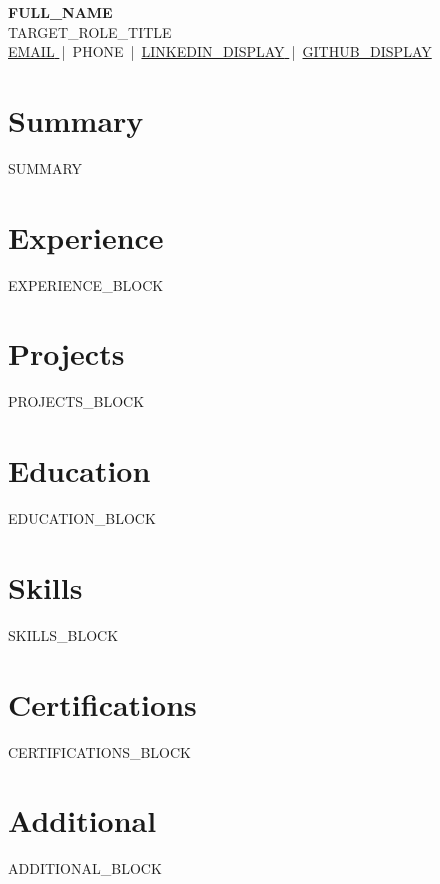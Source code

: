 \documentclass[a4paper,10pt]{article}
\begin{document}
\begin{center}
  {\LARGE\bfseries {{FULL_NAME}} }\\[3pt]
  {\small {{TARGET_ROLE_TITLE}} }\\[4pt]
  {\small
    \href{mailto:{{EMAIL}}}{ {{EMAIL}} } \,|\, {{PHONE}} \,|\,
    \href{ {{LINKEDIN_URL}} }{ {{LINKEDIN_DISPLAY}} } \,|\,
    \href{ {{GITHUB_URL}} }{ {{GITHUB_DISPLAY}} }
  }
\end{center}
\vspace{6pt}

\section*{Summary}
{{SUMMARY}}

\noindent
\begin{minipage}[t]{0.66\textwidth}
  \section*{Experience}
  {{EXPERIENCE_BLOCK}}

  \section*{Projects}
  {{PROJECTS_BLOCK}}
\end{minipage}
\hfill
\begin{minipage}[t]{0.30\textwidth}
  \section*{Education}
  {{EDUCATION_BLOCK}}

  \section*{Skills}
  {{SKILLS_BLOCK}}

  \section*{Certifications}
  {{CERTIFICATIONS_BLOCK}}

  \section*{Additional}
  {{ADDITIONAL_BLOCK}}
\end{minipage}
\end{document}
